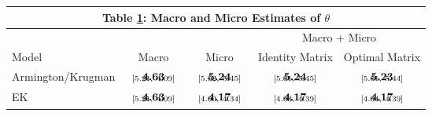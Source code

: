 \documentclass[12pt,dvips, ps2pdf]{article}
\renewcommand{\arraystretch}{1.1}
\begin{document}
\begin{table}[!t]
\footnotesize
{}
\renewcommand{\arraystretch}{1.65}
\setlength {\tabcolsep}{1.75mm}
\begin{center}\label{tb:tariff_rslts}
\begin{tabular}[t]{l c c c c}
\multicolumn{5}{c}{\normalsize\textbf{Table \ref{tb:tariff_rslts}: Macro and Micro Estimates of $\theta$}}
\\
\hline
\hline
&  &  & \multicolumn{2}{c}{Macro + Micro} \\
 \cmidrule(lr){4-5}
 Model &  Macro &  Micro  &  Identity  Matrix &  Optimal  Matrix \\
\hline
Armington/Krugman   & $\begin{array}{c}{\textbf{4.63}} \vspace{-.4cm}\\ \scriptstyle{[5.21,   \ 4.09]}\end{array}$   & $\begin{array}{c}{\textbf{5.24}} \vspace{-.4cm}\\ \scriptstyle{[5.02,   \ 5.45]}\end{array}$  & $\begin{array}{c}{\textbf{5.24}} \vspace{-.4cm}\\ \scriptstyle{[5.01,   \ 5.45]}\end{array}$ &
$\begin{array}{c}{\textbf{5.23}} \vspace{-.4cm}\\ \scriptstyle{[5.01,   \ 5.44]}\end{array}$ \\
EK              & $\begin{array}{c}{\textbf{4.63}} \vspace{-.4cm}\\ \scriptstyle{[5.21,   \ 4.09]}\end{array}$  & $\begin{array}{c}{\textbf{4.17}} \vspace{-.4cm}\\ \scriptstyle{[4.00,   \ 4.34]}\end{array}$  & $\begin{array}{c}{\textbf{4.17}} \vspace{-.4cm}\\ \scriptstyle{[4.03,   \ 4.39]}\end{array}$   & $\begin{array}{c}{\textbf{4.17}} \vspace{-.4cm}\\ \scriptstyle{[4.04,   \ 4.39]}\end{array}$      \\

\end{tabular}
\end{center}
\end{table}
\end{document}
